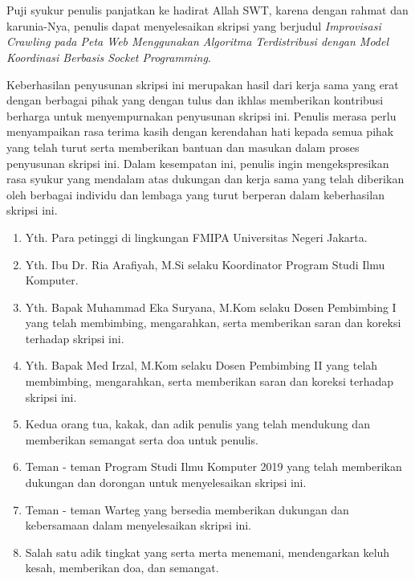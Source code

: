 \chapter*{}
\onehalfspacing{}
Puji syukur penulis panjatkan ke hadirat Allah SWT, karena dengan rahmat dan
karunia-Nya, penulis dapat menyelesaikan skripsi yang berjudul
\textit{Improvisasi Crawling pada Peta Web Menggunakan Algoritma Terdistribusi dengan Model Koordinasi Berbasis Socket Programming}.

Keberhasilan penyusunan skripsi ini merupakan hasil dari kerja sama yang erat dengan berbagai pihak yang dengan tulus dan ikhlas memberikan kontribusi berharga untuk menyempurnakan penyusunan skripsi ini. Penulis merasa perlu menyampaikan rasa terima kasih dengan kerendahan hati kepada semua pihak yang telah turut serta memberikan bantuan dan masukan dalam proses penyusunan skripsi ini. Dalam kesempatan ini, penulis ingin mengekspresikan rasa syukur yang mendalam atas dukungan dan kerja sama yang telah diberikan oleh berbagai individu dan lembaga yang turut berperan dalam keberhasilan skripsi ini.

\begin{enumerate}

	\item{Yth. Para petinggi di lingkungan FMIPA Universitas Negeri Jakarta.}
	\item{Yth. Ibu Dr. Ria Arafiyah, M.Si selaku Koordinator Program Studi Ilmu
		Komputer.}
	\item{Yth. Bapak Muhammad Eka Suryana, M.Kom selaku Dosen Pembimbing I yang
		telah membimbing, mengarahkan, serta memberikan saran dan koreksi terhadap
	 skripsi ini.}
	\item{Yth. Bapak Med Irzal, M.Kom selaku Dosen Pembimbing II yang telah
		membimbing, mengarahkan, serta memberikan saran dan koreksi terhadap
	 skripsi ini.}
	\item{Kedua orang tua, kakak, dan adik penulis yang telah mendukung dan memberikan 
		semangat serta doa untuk penulis.}
	\item{Teman - teman Program Studi Ilmu Komputer 2019 yang telah memberikan 
		dukungan dan dorongan untuk menyelesaikan skripsi ini.}
	\item{Teman - teman Warteg yang bersedia memberikan dukungan dan kebersamaan dalam menyelesaikan skripsi ini.}
	\item{Salah satu adik tingkat yang serta merta menemani, mendengarkan keluh kesah, memberikan doa, dan semangat.}
	
\end{enumerate}

